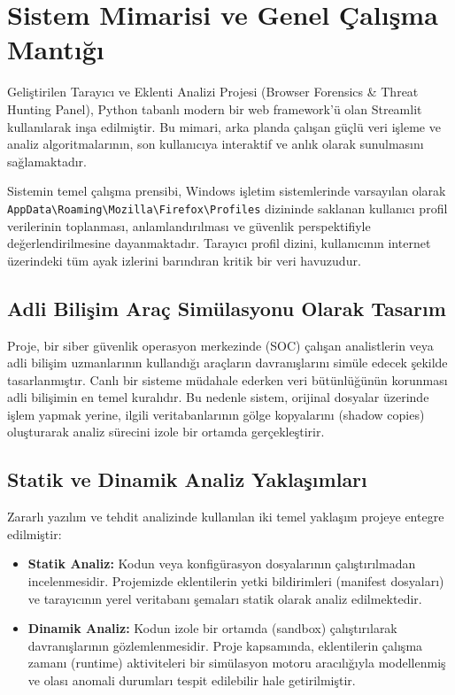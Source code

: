 \documentclass[12pt,a4paper]{article}
\begin{document}
\section{Sistem Mimarisi ve Genel Çalışma Mantığı}

Geliştirilen Tarayıcı ve Eklenti Analizi Projesi (Browser Forensics \& Threat Hunting Panel), Python tabanlı modern bir web framework'ü olan Streamlit kullanılarak inşa edilmiştir. Bu mimari, arka planda çalışan güçlü veri işleme ve analiz algoritmalarının, son kullanıcıya interaktif ve anlık olarak sunulmasını sağlamaktadır. 

Sistemin temel çalışma prensibi, Windows işletim sistemlerinde varsayılan olarak \texttt{AppData\textbackslash Roaming\textbackslash Mozilla\textbackslash Firefox\textbackslash Profiles} dizininde saklanan kullanıcı profil verilerinin toplanması, anlamlandırılması ve güvenlik perspektifiyle değerlendirilmesine dayanmaktadır. Tarayıcı profil dizini, kullanıcının internet üzerindeki tüm ayak izlerini barındıran kritik bir veri havuzudur.

\subsection{Adli Bilişim Araç Simülasyonu Olarak Tasarım}
Proje, bir siber güvenlik operasyon merkezinde (SOC) çalışan analistlerin veya adli bilişim uzmanlarının kullandığı araçların davranışlarını simüle edecek şekilde tasarlanmıştır. Canlı bir sisteme müdahale ederken veri bütünlüğünün korunması adli bilişimin en temel kuralıdır. Bu nedenle sistem, orijinal dosyalar üzerinde işlem yapmak yerine, ilgili veritabanlarının gölge kopyalarını (shadow copies) oluşturarak analiz sürecini izole bir ortamda gerçekleştirir.

\subsection{Statik ve Dinamik Analiz Yaklaşımları}
Zararlı yazılım ve tehdit analizinde kullanılan iki temel yaklaşım projeye entegre edilmiştir:
\begin{itemize}
    \item \textbf{Statik Analiz:} Kodun veya konfigürasyon dosyalarının çalıştırılmadan incelenmesidir. Projemizde eklentilerin yetki bildirimleri (manifest dosyaları) ve tarayıcının yerel veritabanı şemaları statik olarak analiz edilmektedir.
    \item \textbf{Dinamik Analiz:} Kodun izole bir ortamda (sandbox) çalıştırılarak davranışlarının gözlemlenmesidir. Proje kapsamında, eklentilerin çalışma zamanı (runtime) aktiviteleri bir simülasyon motoru aracılığıyla modellenmiş ve olası anomali durumları tespit edilebilir hale getirilmiştir.
\end{itemize}
\end{document}
